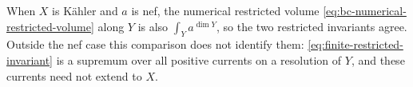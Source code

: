 When $X$ is K\"ahler and $a$ is nef, the numerical restricted volume \eqref{eq:bc-numerical-restricted-volume} along $Y$ is also $\int_Ya^{\dim Y}$, so the two restricted invariants agree. Outside the nef case this comparison does not identify them: \eqref{eq:finite-restricted-invariant} is a supremum over all positive currents on a resolution of $Y$, and these currents need not extend to $X$.
